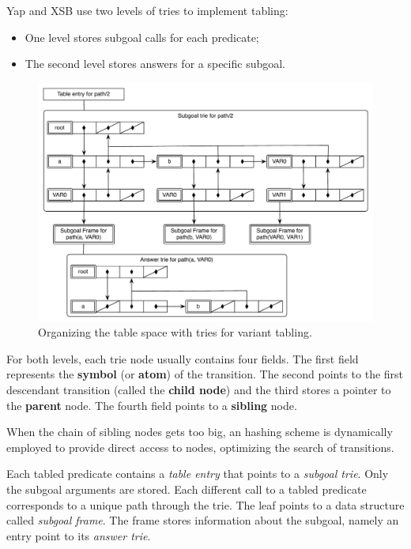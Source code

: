 Yap and XSB use two levels of tries to implement tabling:

\begin{itemize}
  \item One level stores subgoal calls for each predicate;
  \item The second level stores answers for a specific subgoal.
\end{itemize}

\begin{figure}[ht]
   \centering
     \includegraphics[scale=0.6]{two_level_tries.pdf}
   \caption{Organizing the table space with tries for variant tabling.}
   \label{fig:table_space_tries}
 \end{figure}

For both levels, each trie node usually contains four fields. The first field represents the \textbf{symbol} (or \textbf{atom})
of the transition. The second points to the first descendant transition (called the \textbf{child node})
and the third stores a pointer to the \textbf{parent} node.
The fourth field points to a \textbf{sibling} node.

When the chain of sibling nodes gets too big, an hashing scheme is dynamically employed to provide direct
access to nodes, optimizing the search of transitions.

Each tabled predicate contains a \textit{table entry} that points to a \textit{subgoal trie}.
Only the subgoal arguments are stored.
Each different call to a tabled predicate corresponds to a unique path through the trie.
The leaf points to a data structure called \textit{subgoal frame}. The frame stores
information about the subgoal, namely an entry point to its \textit{answer trie}.

